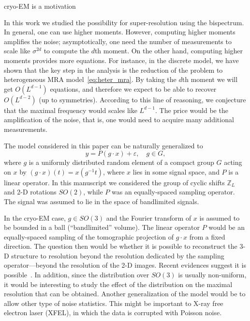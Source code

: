 \documentclass[english,12pt]{article}
\newcommand{\TODO}[1]{{\color{red}{[#1]}}}
\numberwithin{equation}{section}
\numberwithin{thm}{section} %
\begin{document}
cryo-EM is a motivation~\cite{chen2018single}


In this work we studied the possibility for super-resolution using the bispectrum. In general, one can use higher moments. However, computing higher moments amplifies the noise; asymptotically, one need the number of measurements to scale like $\sigma^{2d}$ to compute the $d$th moment. On the other hand, computing higher moments provides more equations. For instance, in the discrete model, we have shown that the key step in the analysis is the reduction of the problem to heterogeneous MRA model~\eqref{eq:heter_mra}.  By taking the $d$th moment we will get  $O(L^{d-1})$ equations, and therefore we expect to be able to recover $O(L^{d-2})$ (up to symmetries). According to this line of reasoning, we conjecture that the maximal frequency would scales like $L^{d-1}$. The price would be the amplification of the noise, that is, one would need to acquire many additional measurements.  

The model considered in this paper can be naturally generalized to 
\begin{equation} \label{eq:general_model}
y = P (g\cdot x) + \varepsilon,\quad g\in G,
\end{equation}
where $g$ is a uniformly distributed random element of a compact group $G$ acting on $x$ by $(g\cdot x)(t) = x(g^{-1}t)$, where $x$ lies in some signal space, and $P$ is a linear operator.  In this manuscript we considered the group of cyclic shifts $\mathbb{Z}_L$ and 2-D rotations $SO(2)$, while $P$ was an equally-spaced sampling operator. The signal was assumed to lie in the space of bandlimited signals.  \TODO{Refs to papers on bispectrum for general groups}

In the cryo-EM case, $g\in SO(3)$ and the Fourier transform of $x$ is assumed to be bounded in a ball (``bandlimited'' volume). The linear operator $P$ would be an equally-spaced sampling of the tomographic projection of $g\cdot x$ from a fixed direction. The question then would be whether it is possible to reconstruct the 3-D structure to resolution beyond the resolution dedicated by the sampling operator---beyond the resolution of the 2-D images. Recent evidences suggest it is possible~\cite{chen2018single}. In addition, since the distribution over $SO(3)$ is usually non-uniform, it would be interesting to study the effect of the distribution on the maximal resolution that can be obtained. Another generalization of the model would be to allow other type of noise statistics. This might be important to X-ray free electron laser (XFEL), in which the data is corrupted with Poisson noise.
 
\end{document}
